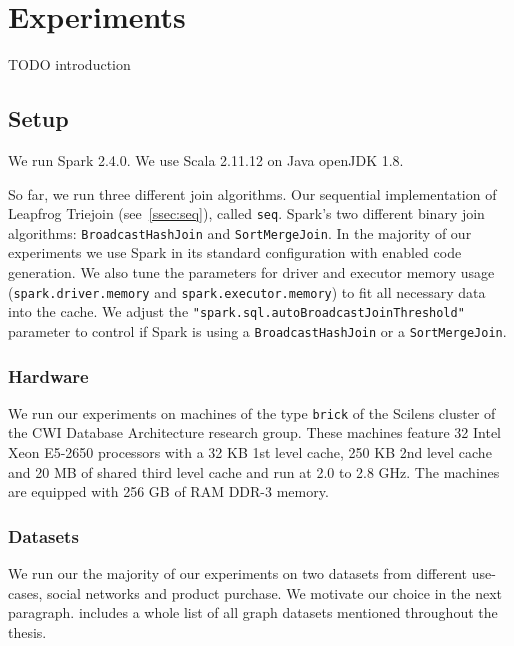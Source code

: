 \section{Experiments}

TODO introduction

\subsection{Setup}


We run Spark 2.4.0.
We use Scala 2.11.12 on Java openJDK 1.8.

So far, we run three different join algorithms.
Our sequential implementation of Leapfrog Triejoin (see~\cref{ssec:seq}), called \texttt{seq}.
Spark's two different binary join algorithms: \texttt{BroadcastHashJoin} and \texttt{SortMergeJoin}.
In the majority of our experiments we use Spark in its standard configuration with enabled code generation.
We also tune the parameters for driver and executor memory usage (\texttt{spark.driver.memory} and \texttt{spark.executor.memory}) to fit all necessary data into the cache.
We adjust the \texttt{"spark.sql.autoBroadcastJoinThreshold"} parameter to control if Spark is using a \texttt{BroadcastHashJoin} or a \texttt{SortMergeJoin}.

\subsubsection{Hardware}

We run our experiments on machines of the type \texttt{brick} of the Scilens cluster of the CWI Database Architecture research group.
These machines feature 32 Intel Xeon E5-2650 processors with a 32 KB 1st level cache, 250 KB 2nd level cache and 20 MB of shared third level cache and run at 2.0 to 2.8 GHz.
The machines are equipped with 256 GB of RAM DDR-3 memory.



\subsubsection{Datasets}
We run our the majority of our experiments on two datasets from different use-cases, social networks and product purchase.
We motivate our choice in the next paragraph.
 includes a whole list of all graph datasets mentioned throughout the thesis.

